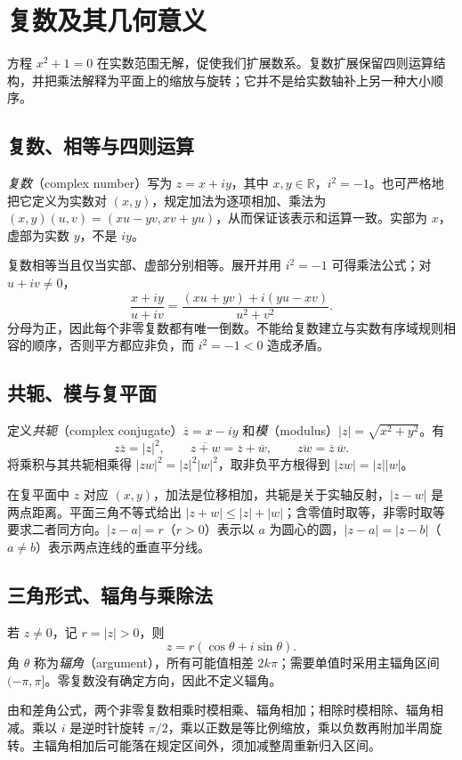 \setcounter{chapter}{20} %
\chapter{复数及其几何意义}
\label{chap:em-complex}
方程 $x^2+1=0$ 在实数范围无解，促使我们扩展数系。复数扩展保留四则运算结构，并把乘法解释为平面上的缩放与旋转；它并不是给实数轴补上另一种大小顺序。

\section{复数、相等与四则运算}
\emph{复数}（complex number）写为 $z=x+iy$，其中 $x,y\in\mathbb R$，$i^2=-1$。也可严格地把它定义为实数对 $(x,y)$，规定加法为逐项相加、乘法为 $(x,y)(u,v)=(xu-yv,xv+yu)$，从而保证该表示和运算一致。实部为 $x$，虚部为实数 $y$，不是 $iy$。

复数相等当且仅当实部、虚部分别相等。展开并用 $i^2=-1$ 可得乘法公式；对 $u+iv\ne0$，
\[
 \frac{x+iy}{u+iv}=
 \frac{(xu+yv)+i(yu-xv)}{u^2+v^2}.
\]
分母为正，因此每个非零复数都有唯一倒数。不能给复数建立与实数有序域规则相容的顺序，否则平方都应非负，而 $i^2=-1<0$ 造成矛盾。

\section{共轭、模与复平面}
定义\emph{共轭}（complex conjugate）$\overline z=x-iy$ 和\emph{模}（modulus）$|z|=\sqrt{x^2+y^2}$。有
\[
 z\overline z=|z|^2,\qquad
 \overline{z+w}=\overline z+\overline w,\qquad
 \overline{zw}=\overline z\,\overline w.
\]
将乘积与其共轭相乘得 $|zw|^2=|z|^2|w|^2$，取非负平方根得到 $|zw|=|z||w|$。

在复平面中 $z$ 对应 $(x,y)$，加法是位移相加，共轭是关于实轴反射，$|z-w|$ 是两点距离。平面三角不等式给出 $|z+w|\le|z|+|w|$；含零值时取等，非零时取等要求二者同方向。$|z-a|=r$（$r>0$）表示以 $a$ 为圆心的圆，$|z-a|=|z-b|$（$a\ne b$）表示两点连线的垂直平分线。

\section{三角形式、辐角与乘除法}
若 $z\ne0$，记 $r=|z|>0$，则
\[
 z=r(\cos\theta+i\sin\theta).
\]
角 $\theta$ 称为\emph{辐角}（argument），所有可能值相差 $2k\pi$；需要单值时采用主辐角区间 $(-\pi,\pi]$。零复数没有确定方向，因此不定义辐角。

由和差角公式，两个非零复数相乘时模相乘、辐角相加；相除时模相除、辐角相减。乘以 $i$ 是逆时针旋转 $\pi/2$，乘以正数是等比例缩放，乘以负数再附加半周旋转。主辐角相加后可能落在规定区间外，须加减整周重新归入区间。

